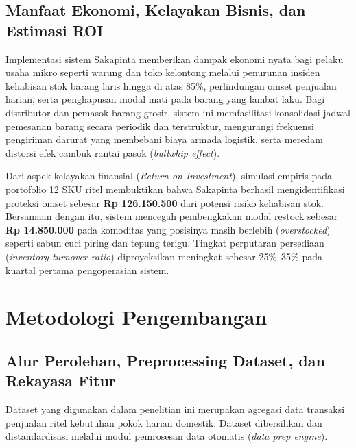 \documentclass[12pt,a4paper]{article}
\begin{document}
\subsection{Manfaat Ekonomi, Kelayakan Bisnis, dan Estimasi ROI}
Implementasi sistem Sakapinta memberikan dampak ekonomi nyata bagi pelaku usaha mikro seperti warung dan toko kelontong melalui penurunan insiden kehabisan stok barang laris hingga di atas 85\%, perlindungan omset penjualan harian, serta penghapusan modal mati pada barang yang lambat laku. Bagi distributor dan pemasok barang grosir, sistem ini memfasilitasi konsolidasi jadwal pemesanan barang secara periodik dan terstruktur, mengurangi frekuensi pengiriman darurat yang membebani biaya armada logistik, serta meredam distorsi efek cambuk rantai pasok (\textit{bullwhip effect}).

Dari aspek kelayakan finansial (\textit{Return on Investment}), simulasi empiris pada portofolio 12 SKU ritel membuktikan bahwa Sakapinta berhasil mengidentifikasi proteksi omset sebesar \textbf{Rp 126.150.500} dari potensi risiko kehabisan stok. Bersamaan dengan itu, sistem mencegah pembengkakan modal restock sebesar \textbf{Rp 14.850.000} pada komoditas yang posisinya masih berlebih (\textit{overstocked}) seperti sabun cuci piring dan tepung terigu. Tingkat perputaran persediaan (\textit{inventory turnover ratio}) diproyeksikan meningkat sebesar 25\%--35\% pada kuartal pertama pengoperasian sistem.

\section{Metodologi Pengembangan}

\subsection{Alur Perolehan, Preprocessing Dataset, dan Rekayasa Fitur}
Dataset yang digunakan dalam penelitian ini merupakan agregasi data transaksi penjualan ritel kebutuhan pokok harian domestik. Dataset dibersihkan dan distandardisasi melalui modul pemrosesan data otomatis (\textit{data prep engine}).
\end{document}
